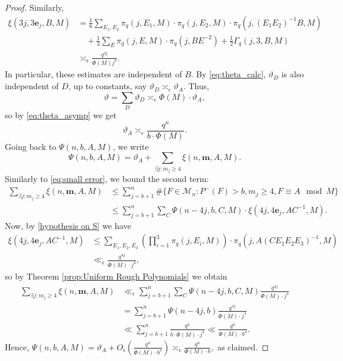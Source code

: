 \documentclass[12pt]{amsart}
\numberwithin{equation}{section}
\theoremstyle{definition}
\theoremstyle{remark}
\newcommand{\ps}[1]{\left( #1 \right)}
\begin{document}
\begin{proof}
    Similarly,
    \begin{align*}
        \xi(3j,3\boldsymbol{e}_j,B,M)  &= \frac{1}{6}\sum_{E_1,E_2} \pi_q(j,E_1,M) \cdot \pi_q(j,E_2,M) \cdot \pi_q(j,(E_1E_2)^{-1}B,M) \\
        &\quad + \frac{1}{3} \sum_{E} \pi_q(j,E,M) \cdot \pi_q(j,BE^{-2}) + \frac{1}{2} \Gamma_q(j,3,B,M) \\
        &\asymp_{\epsilon} \frac{q^{3j}}{\Phi(M) j^3}.
    \end{align*}
    In particular, these estimates are independent of $B$.
    By \eqref{eq:theta_calc}, $\vartheta_D$ is also independent of $D$, up to constants, say $\vartheta_D \asymp_\epsilon \vartheta_A$. Thus,
    \begin{equation*}
        \vartheta = \sum_D \vartheta_D \asymp_\epsilon \Phi(M) \cdot \vartheta_A,
    \end{equation*}
    so by \eqref{eq:theta_asymp} we get
    \begin{equation*}
        \vartheta_A \asymp_{\epsilon} \frac{q^n}{b \cdot \Phi(M)}  .
    \end{equation*}
    Going back to $\Psi(n,b,A,M)$, we write
    \begin{equation}\label{eq:split_mod}
        \Psi(n,b,A,M)  
        = \vartheta_A + \sum_{\exists j: m_j \geq 4} \xi(n,\boldsymbol{m},A,M).
    \end{equation}
    Similarly to \eqref{eq:small error}, we bound the second term:
    \begin{align*}
        \sum_{\exists j: m_j \geq 4} \xi(n,\boldsymbol{m},A,M) &\leq \sum_{j=b+1}^n \# \{F \in \mathcal{M}_n: P^-(F) > b, m_j \geq 4, F \equiv A \mod M \} \\
        &\leq \sum_{j=b+1}^n \sum_{C} \Psi(n-4j,b,C,M) \cdot \xi(4j, 4\boldsymbol{e}_j,AC^{-1},M).
    \end{align*}
    Now, by \eqref{hypothesis on S} we have
    \begin{align*}
        \xi(4j, 4\boldsymbol{e}_j,AC^{-1},M) &\leq \sum_{E_1,E_2,E_3} \ps{\prod_{i=1}^3 \pi_q(j,E_i,M)} \cdot \pi_q(j, A(CE_1E_2E_3)^{-1},M) \\
        &\ll_{\epsilon} \frac{q^{4j}}{\Phi(M) \cdot j^4},
    \end{align*}
    so by Theorem \ref{prop:Uniform Rough Polynomials} we obtain
    \begin{align*}
        \sum_{\exists j: m_j \geq 4} \xi(n,\boldsymbol{m},A,M) &\ll_{\epsilon} \sum_{j=b+1}^n \sum_C \Psi(n-4j,b,C,M) \frac{q^{4j}}{\Phi(M) \cdot j^4} \\
        &= \sum_{j=b+1}^n \Psi(n-4j,b) \frac{q^{4j}}{\Phi(M) \cdot j^4} \\
        &\ll \sum_{j=b+1}^n \frac{q^n}{b\cdot \Phi(M) \cdot j^4} 
        \ll \frac{q^n}{\Phi(M) \cdot b^4}.
    \end{align*}
    Hence, 
    \(
        \Psi(n,b,A,M) = \vartheta_A+O_{\epsilon}\ps{\frac{q^n}{\Phi(M)\cdot b^4}} \asymp_{\epsilon} \frac{q^n}{\Phi(M) \cdot b},
    \)
    as  claimed.
\end{proof}
\end{document}
